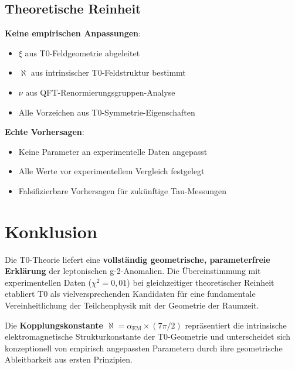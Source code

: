 \documentclass[12pt,a4paper]{article}
\newcommand{\xipar}{\xi}
\newcommand{\alphagem}{\alpha_{\text{EM}}}
\newcommand{\nulep}{\nu}
\newcommand{\chisquared}{\chi^2}
\begin{document}
	\subsection{Theoretische Reinheit}
	
	\textbf{Keine empirischen Anpassungen}:
	\begin{itemize}
		\item $\xipar$ aus T0-Feldgeometrie abgeleitet
		\item $\aleph$ aus intrinsischer T0-Feldstruktur bestimmt
		\item $\nulep$ aus QFT-Renormierungsgruppen-Analyse
		\item Alle Vorzeichen aus T0-Symmetrie-Eigenschaften
	\end{itemize}
	
	\textbf{Echte Vorhersagen}:
	\begin{itemize}
		\item Keine Parameter an experimentelle Daten angepasst
		\item Alle Werte vor experimentellem Vergleich festgelegt
		\item Falsifizierbare Vorhersagen f\"ur zuk\"unftige Tau-Messungen
	\end{itemize}
	
	\section{Konklusion}
	
	Die T0-Theorie liefert eine \textbf{vollst\"andig geometrische, parameterfreie Erkl\"arung} der leptonischen g-2-Anomalien. Die \"Ubereinstimmung mit experimentellen Daten ($\chisquared = 0{,}01$) bei gleichzeitiger theoretischer Reinheit etabliert T0 als vielversprechenden Kandidaten f\"ur eine fundamentale Vereinheitlichung der Teilchenphysik mit der Geometrie der Raumzeit.
	
	Die \textbf{Kopplungskonstante $\aleph = \alphagem \times (7\pi/2)$} repr\"asentiert die intrinsische elektromagnetische Strukturkonstante der T0-Geometrie und unterscheidet sich konzeptionell von empirisch angepassten Parametern durch ihre geometrische Ableitbarkeit aus ersten Prinzipien.
	
\end{document}
